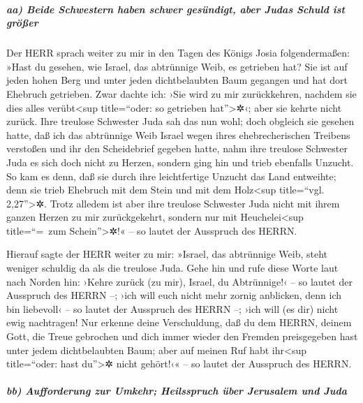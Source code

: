\hypertarget{aa-beide-schwestern-haben-schwer-gesuxfcndigt-aber-judas-schuld-ist-gruxf6uxdfer}{%
\subparagraph{aa) Beide Schwestern haben schwer gesündigt, aber Judas
Schuld ist
größer}\label{aa-beide-schwestern-haben-schwer-gesuxfcndigt-aber-judas-schuld-ist-gruxf6uxdfer}}

Der HERR sprach weiter zu mir in den Tagen des Königs
Josia folgendermaßen: »Hast du gesehen, wie Israel, das abtrünnige Weib,
es getrieben hat? Sie ist auf jeden hohen Berg und unter jeden
dichtbelaubten Baum gegangen und hat dort Ehebruch getrieben.
Zwar dachte ich: ›Sie wird zu mir zurückkehren, nachdem
sie dies alles verübt\textless sup title=``oder: so getrieben
hat''\textgreater✲‹; aber sie kehrte nicht zurück. Ihre treulose
Schwester Juda sah das nun wohl; doch obgleich sie gesehen
hatte, daß ich das abtrünnige Weib Israel wegen ihres ehebrecherischen
Treibens verstoßen und ihr den Scheidebrief gegeben hatte, nahm ihre
treulose Schwester Juda es sich doch nicht zu Herzen, sondern ging hin
und trieb ebenfalls Unzucht. So kam es denn, daß sie durch
ihre leichtfertige Unzucht das Land entweihte; denn sie trieb Ehebruch
mit dem Stein und mit dem Holz\textless sup title=``vgl.
2,27''\textgreater✲. Trotz alledem ist aber ihre treulose
Schwester Juda nicht mit ihrem ganzen Herzen zu mir zurückgekehrt,
sondern nur mit Heuchelei\textless sup title=``=~zum
Schein''\textgreater✲!« -- so lautet der Ausspruch des HERRN.

Hierauf sagte der HERR weiter zu mir: »Israel, das
abtrünnige Weib, steht weniger schuldig da als die treulose Juda.
Gehe hin und rufe diese Worte laut nach Norden hin:
›Kehre zurück (zu mir), Israel, du Abtrünnige!‹ -- so lautet der
Ausspruch des HERRN --; ›ich will euch nicht mehr zornig anblicken, denn
ich bin liebevoll‹ -- so lautet der Ausspruch des HERRN --; ›ich will
(es dir) nicht ewig nachtragen! Nur erkenne deine
Verschuldung, daß du dem HERRN, deinem Gott, die Treue gebrochen und
dich immer wieder den Fremden preisgegeben hast unter jedem
dichtbelaubten Baum; aber auf meinen Ruf habt ihr\textless sup
title=``oder: hast du''\textgreater✲ nicht gehört!‹« -- so lautet der
Ausspruch des HERRN.

\hypertarget{bb-aufforderung-zur-umkehr-heilsspruch-uxfcber-jerusalem-und-juda}{%
\subparagraph{bb) Aufforderung zur Umkehr; Heilsspruch über Jerusalem
und
Juda}\label{bb-aufforderung-zur-umkehr-heilsspruch-uxfcber-jerusalem-und-juda}}

